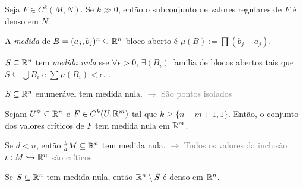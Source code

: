 
\begin{theorem}
    Seja \(F\in C^k(M,N)\). Se \(k \gg 0\), então o subconjunto de valores regulares de \(F\) é denso em \(N\).%
\end{theorem}

\begin{note}
    A \emph{medida} de \(B= (a_j,b_j)^n\subseteq \mathbb{R}^n\) bloco aberto é \(\mu(B):= \prod (b_j-a_j)\).
\end{note}

\begin{definition}
    \(S\subseteq \mathbb{R}^n\) tem \emph{medida nula} sse \(\forall \epsilon >0\),  \(\exists  (B_i)\) familia de blocos abertos tais que  \(S\subseteq \bigcup B_i\) e \(\sum \mu(B_i)< \epsilon\). .  
\end{definition}

\begin{example}
    \(S\subseteq \mathbb{R}^n\) enumerável tem medida nula.  \textcolor{gray}{\(\rightarrow\) São pontos isolados} 
\end{example}
\hypertarget{thmSard}{}
\begin{theorem}
    Sejam \(U\ab\subseteq \R^n\) e \(F\in C^k(U, \mathbb{R}^m)\) tal que \(k\geq \{n-m+1, 1\}\). Então, o conjunto dos valores críticos de \(F\) tem medida nula em \(\mathbb{R}^m\). 
\end{theorem}

\begin{corollary}
    Se \(d<n\), então \(^k_d M\subseteq \mathbb{R}^n\) tem medida nula. \textcolor{gray}{\(\rightarrow\) Todos os valores da inclusão \(\iota : M \hookrightarrow \mathbb{R}^n\) são críticos}
\end{corollary}

\begin{exercise}
    Se \(S\subseteq \mathbb{R}^n \) tem medida nula, então \(\mathbb{R}^n\setminus S \) é denso em \(\mathbb{R}^n\). 
\end{exercise}
